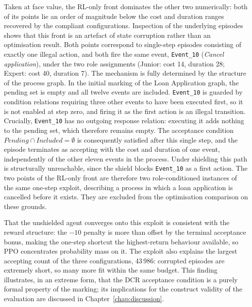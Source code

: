 Taken at face value, the \ac{RL}-only front dominates the other two
numerically: both of its points lie an order of magnitude below the
cost and duration ranges recovered by the compliant configurations.
Inspection of the underlying episodes shows that this front is an
artefact of state corruption rather than an optimisation result. Both
points correspond to single-step episodes consisting of exactly one
illegal action, and both fire the same event, \texttt{Event\_10}
(\textit{Cancel application}), under the two role assignments (Junior:
cost 14, duration 28; Expert: cost 40, duration 7). The mechanism is
fully determined by the structure of the process graph. In the initial
marking of the Loan Application graph, the pending set is empty and all
twelve events are included. \texttt{Event\_10} is guarded by condition
relations requiring three other events to have been executed first, so
it is not enabled at step zero, and firing it as the first action is an
illegal transition. Crucially, \texttt{Event\_10} has no outgoing
response relation: executing it adds nothing to the pending set, which
therefore remains empty. The acceptance condition
$\mathit{Pending} \cap \mathit{Included} = \emptyset$ is consequently
satisfied after this single step, and the episode terminates as
accepting with the cost and duration of one event, independently of the
other eleven events in the process. Under shielding this path is
structurally unreachable, since the shield blocks \texttt{Event\_10} as
a first action. The two points of the \ac{RL}-only front are therefore
two role-conditioned instances of the same one-step exploit, describing
a process in which a loan application is cancelled before it exists.
They are excluded from the optimisation comparison on these grounds.

That the unshielded agent converges onto this exploit is consistent
with the reward structure: the $-10$ penalty is more than offset by the
terminal acceptance bonus, making the one-step shortcut the
highest-return behaviour available, so \ac{PPO} concentrates
probability mass on it. The exploit also explains the largest accepting
count of the three configurations, 43\,986: corrupted episodes are
extremely short, so many more fit within the same budget. This finding
illustrates, in an extreme form, that the \ac{DCR} acceptance condition
is a purely formal property of the marking; its implications for the
construct validity of the evaluation are discussed in
Chapter~\ref{chap:discussion}.

